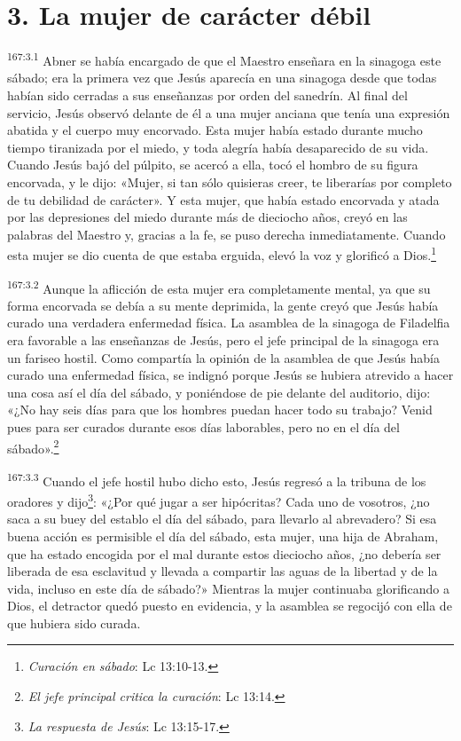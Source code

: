 \section*{3. La mujer de carácter débil}
\par 
\textsuperscript{167:3.1} Abner se había encargado de que el Maestro enseñara en la sinagoga este sábado; era la primera vez que Jesús aparecía en una sinagoga desde que todas habían sido cerradas a sus enseñanzas por orden del sanedrín. Al final del servicio, Jesús observó delante de él a una mujer anciana que tenía una expresión abatida y el cuerpo muy encorvado. Esta mujer había estado durante mucho tiempo tiranizada por el miedo, y toda alegría había desaparecido de su vida. Cuando Jesús bajó del púlpito, se acercó a ella, tocó el hombro de su figura encorvada, y le dijo: «Mujer, si tan sólo quisieras creer, te liberarías por completo de tu debilidad de carácter». Y esta mujer, que había estado encorvada y atada por las depresiones del miedo durante más de dieciocho años, creyó en las palabras del Maestro y, gracias a la fe, se puso derecha inmediatamente. Cuando esta mujer se dio cuenta de que estaba erguida, elevó la voz y glorificó a Dios.\footnote{\textit{Curación en sábado}: Lc 13:10-13.}

\par 
\textsuperscript{167:3.2} Aunque la aflicción de esta mujer era completamente mental, ya que su forma encorvada se debía a su mente deprimida, la gente creyó que Jesús había curado una verdadera enfermedad física. La asamblea de la sinagoga de Filadelfia era favorable a las enseñanzas de Jesús, pero el jefe principal de la sinagoga era un fariseo hostil. Como compartía la opinión de la asamblea de que Jesús había curado una enfermedad física, se indignó porque Jesús se hubiera atrevido a hacer una cosa así el día del sábado, y poniéndose de pie delante del auditorio, dijo: «¿No hay seis días para que los hombres puedan hacer todo su trabajo? Venid pues para ser curados durante esos días laborables, pero no en el día del sábado».\footnote{\textit{El jefe principal critica la curación}: Lc 13:14.}

\par 
\textsuperscript{167:3.3} Cuando el jefe hostil hubo dicho esto, Jesús regresó a la tribuna de los oradores y dijo\footnote{\textit{La respuesta de Jesús}: Lc 13:15-17.}: «¿Por qué jugar a ser hipócritas? Cada uno de vosotros, ¿no saca a su buey del establo el día del sábado, para llevarlo al abrevadero? Si esa buena acción es permisible el día del sábado, esta mujer, una hija de Abraham, que ha estado encogida por el mal durante estos dieciocho años, ¿no debería ser liberada de esa esclavitud y llevada a compartir las aguas de la libertad y de la vida, incluso en este día de sábado?» Mientras la mujer continuaba glorificando a Dios, el detractor quedó puesto en evidencia, y la asamblea se regocijó con ella de que hubiera sido curada.

